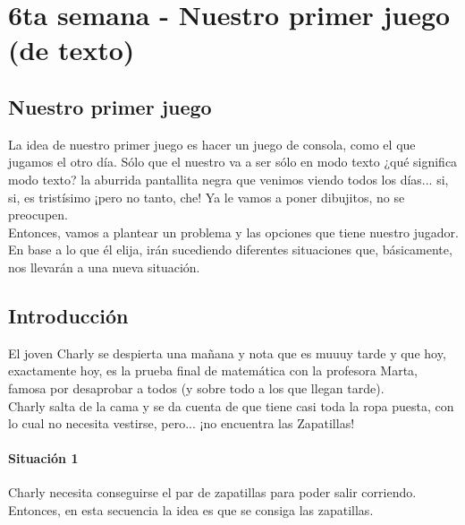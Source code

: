 \chapter{6ta semana - Nuestro primer juego (de texto)}

\section{Nuestro primer juego}
La idea de nuestro primer juego es hacer un juego de consola, como el que jugamos el otro día. Sólo que el nuestro va a ser sólo en modo texto ¿qué significa modo texto? la aburrida pantallita negra que venimos viendo todos los días... si, si, es tristísimo ¡pero no tanto, che! Ya le vamos a poner dibujitos, no se preocupen.\\

Entonces, vamos a plantear un problema y las opciones que tiene nuestro jugador. En base a lo que él elija, irán sucediendo diferentes situaciones que, básicamente, nos llevarán a una nueva situación.

\section{Introducción}
El joven Charly se despierta una mañana y nota que es muuuy tarde y que hoy, exactamente hoy, es la prueba final de matemática con la profesora Marta, famosa por desaprobar a todos (y sobre todo a los que llegan tarde).\\

Charly salta de la cama y se da cuenta de que tiene casi toda la ropa puesta, con lo cual no necesita vestirse, pero... ¡no encuentra las Zapatillas!

\subsubsection{Situación 1}
Charly necesita conseguirse el par de zapatillas para poder salir corriendo. Entonces, en esta secuencia la idea es que se consiga las zapatillas.\\

